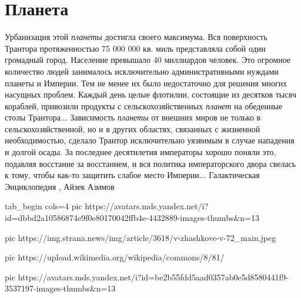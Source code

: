  
 
 
 
 
\chapter{Планета}
\label{sec:slova.planeta}

Урбанизация этой \emph{планеты} достигла своего максимума. Вся поверхность Трантора
протяженностью 75 000 000 кв. миль представляла собой один громадный город.
Население превышало 40 миллиардов человек. Это огромное количество людей
занималось исключительно административными нуждами планеты и Империи. Тем не
менее их было недостаточно для решения многих насущных проблем. Каждый день
целые флотилии, состоящие из десятков тысяч кораблей, привозили продукты с
сельскохозяйственных \emph{планет} на обеденные столы Трантора...
Зависимость \emph{планеты} от внешних миров не только в сельскохозяйственной,
но и в других областях, связанных с жизненной необходимостью, сделало Трантор
исключительно уязвимым в случае нападения и долгой осады. За последнее
десятилетия императоры хорошо поняли это, подавляя восстание за восстанием, и
вся политика императорского двора свелась к тому, чтобы как-то защитить слабое
место Империи... Галактическая Энциклопедия
, Айзек Азимов

\ifcmt
  tab_begin cols=4
		 pic https://avatars.mds.yandex.net/i?id=dbbd2a10586874e9f0e80170042ffb4e-4432889-images-thumbs&n=13

     pic https://img.strana.news/img/article/3618/v-zhashkove-v-72_main.jpeg

     pic https://upload.wikimedia.org/wikipedia/commons/8/81/%

		 pic https://avatars.mds.yandex.net/i?id=be2b55fdd5aad0357ab0e5d8580441f9-3537197-images-thumbs&n=13

